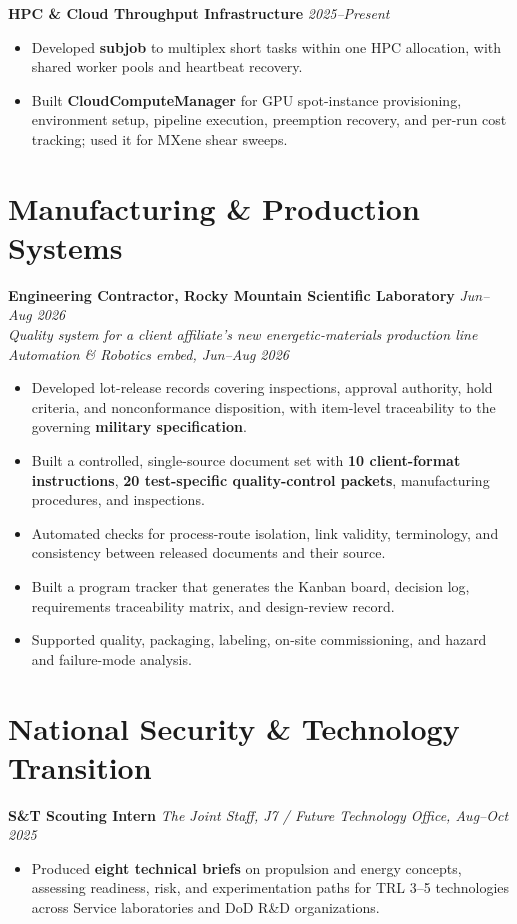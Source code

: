\documentclass[letterpaper,10pt]{article}
\newcommand{\keep}{\needspace{4\baselineskip}}
\newcommand{\keepsection}{\needspace{6\baselineskip}}
\begin{document}
\keep\textbf{HPC \& Cloud Throughput Infrastructure} \hfill \textit{2025--Present}
\begin{itemize}
    \item Developed \textbf{subjob} to multiplex short tasks within one HPC allocation, with shared worker pools and heartbeat recovery.
    \item Built \textbf{CloudComputeManager} for GPU spot-instance provisioning, environment setup, pipeline execution, preemption recovery, and per-run cost tracking; used it for MXene shear sweeps.
\end{itemize}

\keepsection\section*{Manufacturing \& Production Systems}
\textbf{Engineering Contractor, Rocky Mountain Scientific Laboratory} \hfill \textit{Jun--Aug 2026}\\
\textit{Quality system for a client affiliate's new energetic-materials production line}\\
\textit{Automation \& Robotics embed, Jun--Aug 2026}
\begin{itemize}
    \item Developed lot-release records covering inspections, approval authority, hold criteria, and nonconformance disposition, with item-level traceability to the governing \textbf{military specification}.
    \item Built a controlled, single-source document set with \textbf{10 client-format instructions}, \textbf{20 test-specific quality-control packets}, manufacturing procedures, and inspections.
    \item Automated checks for process-route isolation, link validity, terminology, and consistency between released documents and their source.
    \item Built a program tracker that generates the Kanban board, decision log, requirements traceability matrix, and design-review record.
    \item Supported quality, packaging, labeling, on-site commissioning, and hazard and failure-mode analysis.
\end{itemize}

\keepsection\section*{National Security \& Technology Transition}
\textbf{S\&T Scouting Intern} \hfill \textit{The Joint Staff, J7 / Future Technology Office, Aug--Oct 2025}
\begin{itemize}
    \item Produced \textbf{eight technical briefs} on propulsion and energy concepts, assessing readiness, risk, and experimentation paths for TRL 3--5 technologies across Service laboratories and DoD R\&D organizations.
\end{itemize}
\end{document}
